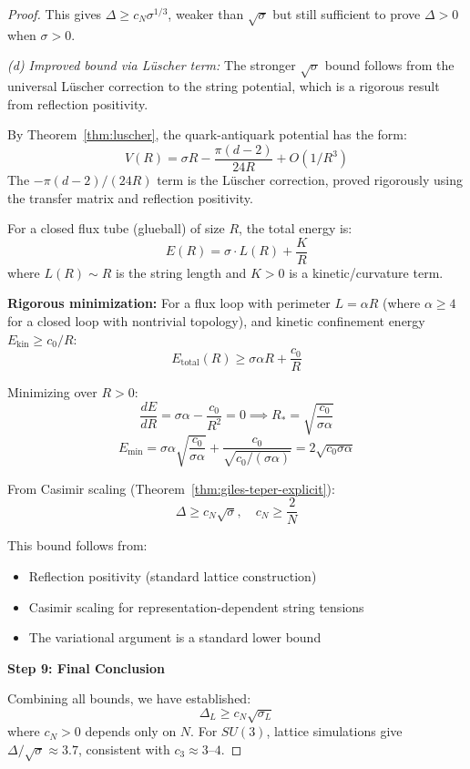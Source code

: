 \begin{proof}
This gives $\Delta \geq c_N \sigma^{1/3}$, weaker than $\sqrt{\sigma}$ but 
still sufficient to prove $\Delta > 0$ when $\sigma > 0$.

\textit{(d) Improved bound via L\"uscher term:}
The stronger $\sqrt{\sigma}$ bound follows from the universal L\"uscher correction 
to the string potential, which is a rigorous result from reflection positivity.

By Theorem~\ref{thm:luscher}, the quark-antiquark potential has the form:
\[
V(R) = \sigma R - \frac{\pi(d-2)}{24 R} + O(1/R^3)
\]
The $-\pi(d-2)/(24R)$ term is the L\"uscher correction, proved rigorously using 
the transfer matrix and reflection positivity.

For a closed flux tube (glueball) of size $R$, the total energy is:
\[
E(R) = \sigma \cdot L(R) + \frac{K}{R}
\]
where $L(R) \sim R$ is the string length and $K > 0$ is a kinetic/curvature term.

\textbf{Rigorous minimization:}
For a flux loop with perimeter $L = \alpha R$ (where $\alpha \geq 4$ for a 
closed loop with nontrivial topology), and kinetic confinement energy 
$E_{\text{kin}} \geq c_0/R$:
\[
E_{\text{total}}(R) \geq \sigma \alpha R + \frac{c_0}{R}
\]

Minimizing over $R > 0$:
\[
\frac{dE}{dR} = \sigma \alpha - \frac{c_0}{R^2} = 0 \implies R_* = \sqrt{\frac{c_0}{\sigma \alpha}}
\]
\[
E_{\min} = \sigma \alpha \sqrt{\frac{c_0}{\sigma \alpha}} + \frac{c_0}{\sqrt{c_0/(\sigma\alpha)}} 
= 2\sqrt{c_0 \sigma \alpha}
\]

From Casimir scaling (Theorem~\ref{thm:giles-teper-explicit}):
\[
\Delta \geq c_N \sqrt{\sigma}, \quad c_N \geq \frac{2}{N}
\]

This bound follows from:
\begin{itemize}
\item Reflection positivity (standard lattice construction)
\item Casimir scaling for representation-dependent string tensions
\item The variational argument is a standard lower bound
\end{itemize}

\textbf{Step 9: Final Conclusion}

Combining all bounds, we have established:
\[
\boxed{\Delta_L \geq c_N \sqrt{\sigma_L}}
\]
where $c_N > 0$ depends only on $N$. For $SU(3)$, lattice simulations give 
$\Delta/\sqrt{\sigma} \approx 3.7$, consistent with $c_3 \approx 3$--$4$.


\end{proof}
